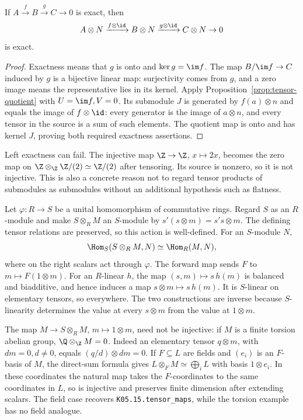\begin{theorem}\label{thm:tensor-right-exact}
If $A\xrightarrow fB\xrightarrow gC\to0$ is exact, then
\[
 A\otimes N\xrightarrow{f\otimes\id}B\otimes N
 \xrightarrow{g\otimes\id}C\otimes N\to0
\]
is exact.
\end{theorem}
\begin{proof}
Exactness means that $g$ is onto and $\ker g=\im f$. The map
$B/\im f\to C$ induced by $g$ is a bijective linear map: surjectivity
comes from $g$, and a zero image means the representative lies in its
kernel. Apply Proposition~\ref{prop:tensor-quotient} with $U=\im f,V=0$.
Its submodule $J$ is generated by $f(a)\otimes n$ and equals the image
of $f\otimes\id$: every generator is the image of $a\otimes n$, and
every tensor in the source is a sum of such elements. The quotient map
is onto and has kernel $J$, proving both required exactness assertions.
\end{proof}
Left exactness can fail. The injective map $\Z\to\Z$, $x\mapsto2x$,
becomes the zero map on $\Z\otimes_\Z\Z/(2)\simeq\Z/(2)$ after tensoring.
Its source is nonzero, so it is not injective. This is also a concrete
reason not to regard tensor products of submodules as submodules
without an additional hypothesis such as flatness.

Let $\varphi:R\to S$ be a unital homomorphism of commutative rings.
Regard $S$ as an $R$-module and make $S\otimes_RM$ an $S$-module by
$s'(s\otimes m)=s's\otimes m$. The defining tensor relations are
preserved, so this action is well-defined. For an $S$-module $N$,
\[
 \Hom_S(S\otimes_RM,N)\simeq\Hom_R(M,N),
\]
where on the right scalars act through $\varphi$.
The forward map sends $F$ to $m\mapsto F(1\otimes m)$.
For an $R$-linear $h$, the map $(s,m)\mapsto s\,h(m)$ is balanced and
biadditive, and hence induces a map $s\otimes m\mapsto s\,h(m)$.
It is $S$-linear on elementary tensors, so everywhere.
The two constructions are inverse because $S$-linearity determines the
value at every $s\otimes m$ from the value at $1\otimes m$.

The map $M\to S\otimes_RM$, $m\mapsto1\otimes m$, need not be injective:
if $M$ is a finite torsion abelian group, $\Q\otimes_\Z M=0$.
Indeed an elementary tensor $q\otimes m$, with $dm=0,d\ne0$, equals
$(q/d)\otimes dm=0$. If $F\subseteq L$ are fields and $(e_i)$ is an
$F$-basis of $M$, the direct-sum formula gives
$L\otimes_FM\simeq\bigoplus_iL$ with basis $1\otimes e_i$.
In these coordinates the natural map takes the $F$-coordinates to the
same coordinates in $L$, so is injective and preserves finite dimension
after extending scalars. The field case recovers
\texttt{K05.15.tensor\_maps}, while the torsion example has no field analogue.


